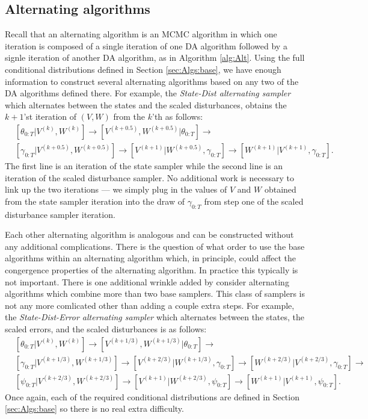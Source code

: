 \documentclass{article}
\begin{document}
\subsection{Alternating algorithms}\label{sec:Algs:alt}
Recall that an alternating algorithm is an MCMC algorithm in which one iteration is composed of a single iteration of one DA algorithm followed by a signle iteration of another DA algorithm, as in Algorithm \ref{alg:Alt}. Using the full conditional distributions defined in Section \ref{sec:Algs:base}, we have enough information to construct several alternating algorithms based on any two of the DA algorithms defined there. For example, the {\it State-Dist alternating sampler} which alternates between the states and the scaled disturbances, obtains the $k+1$'st iteration of $(V,W)$ from the $k$'th as follows:
\begin{align*}
&[\theta_{0:T}|V^{(k)},W^{(k)}] \to [V^{(k+0.5)},W^{(k+0.5)}|\theta_{0:T}] \to\\ 
&[\gamma_{0:T}|V^{(k+0.5)},W^{(k+0.5)}] \to [V^{(k+1)}|W^{(k+0.5)},\gamma_{0:T}] \to [W^{(k+1)}|V^{(k+1)},\gamma_{0:T}].
\end{align*}
The first line is an iteration of the state sampler while the second line is an iteration of the scaled disturbance sampler. No additional work is necessary to link up the two iterations --- we simply plug in the values of $V$ and $W$ obtained from the state sampler iteration into the draw of $\gamma_{0:T}$ from step one of the scaled disturbance sampler iteration.

Each other alternating algorithm is analogous and can be constructed without any additional complications. There is the question of what order to use the base algorithms within an alternating algorithm which, in principle, could affect the congergence properties of the alternating algorithm. In practice this typically is not important. There is one additional wrinkle added by consider alternating algorithms which combine more than two base samplers. This class of samplers is not any more comlicated other than adding a couple extra steps. For example, the {\it State-Dist-Error alternating sampler} which alternates between the states, the scaled errors, and the scaled disturbances is as follows:
\begin{align*}
&[\theta_{0:T}|V^{(k)},W^{(k)}] \to [V^{(k+1/3)},W^{(k+1/3)}|\theta_{0:T}] \to\\ 
&[\gamma_{0:T}|V^{(k+1/3)},W^{(k+1/3)}] \to [V^{(k+2/3)}|W^{(k+1/3)},\gamma_{0:T}] \to [W^{(k+2/3)}|V^{(k+2/3)},\gamma_{0:T}]\to \\
&[\psi_{0:T}|V^{(k+2/3)},W^{(k+2/3)}] \to [V^{(k+1)}|W^{(k+2/3)},\psi_{0:T}] \to [W^{(k+1)}|V^{(k+1)},\psi_{0:T}].
\end{align*}
Once again, each of the required conditional distributions are defined in Section \ref{sec:Algs:base} so there is no real extra difficulty.
\end{document}
